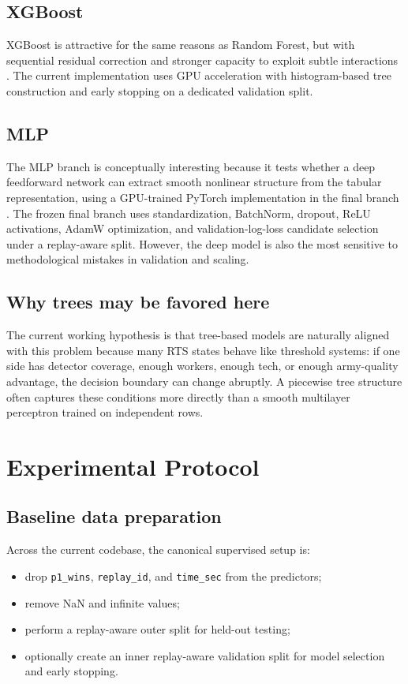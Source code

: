 \documentclass[11pt,a4paper]{article}
\begin{document}
	\subsection{XGBoost}
	XGBoost is attractive for the same reasons as Random Forest, but with sequential residual correction and stronger capacity to exploit subtle interactions \cite{chen2016xgboost}. The current implementation uses GPU acceleration with histogram-based tree construction and early stopping on a dedicated validation split.
	
	\subsection{MLP}
	The MLP branch is conceptually interesting because it tests whether a deep feedforward network can extract smooth nonlinear structure from the tabular representation, using a GPU-trained PyTorch implementation in the final branch \cite{paszke2019pytorch}. The frozen final branch uses standardization, BatchNorm, dropout, ReLU activations, AdamW optimization, and validation-log-loss candidate selection under a replay-aware split. However, the deep model is also the most sensitive to methodological mistakes in validation and scaling.
	
	\subsection{Why trees may be favored here}
	The current working hypothesis is that tree-based models are naturally aligned with this problem because many RTS states behave like threshold systems: if one side has detector coverage, enough workers, enough tech, or enough army-quality advantage, the decision boundary can change abruptly. A piecewise tree structure often captures these conditions more directly than a smooth multilayer perceptron trained on independent rows.


\section{Experimental Protocol}
\subsection{Baseline data preparation}
Across the current codebase, the canonical supervised setup is:
\begin{itemize}
    \item drop \texttt{p1\_wins}, \texttt{replay\_id}, and \texttt{time\_sec} from the predictors;
    \item remove NaN and infinite values;
    \item perform a replay-aware outer split for held-out testing;
    \item optionally create an inner replay-aware validation split for model selection and early stopping.
\end{itemize}
\end{document}

